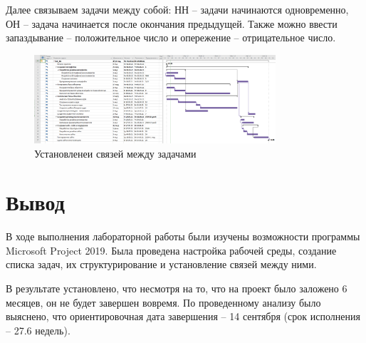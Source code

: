 Далее связываем задачи между собой: НН -- задачи начинаются одновременно, ОН -- задача начинается после окончания предыдущей. Также можно ввести запаздывание -- положительное число и опережение -- отрицательное число.

\begin{figure}[H]
	\centering
	\includegraphics[width=0.8\textwidth]{img/content/link_tasks.png}
	\caption{Установленеи связей между задачами}
\end{figure}

\section{Вывод}

В ходе выполнения лабораторной работы были изучены возможности программы Microsoft Project 2019. Была проведена настройка рабочей среды, создание списка задач, их структурирование и установление связей между ними.

В результате установлено, что несмотря на то, что на проект было заложено 6 месяцев, он не будет завершен вовремя. По проведенному анализу было выяснено, что ориентировочная дата завершения – 14 сентября (срок исполнения – 27.6 недель).